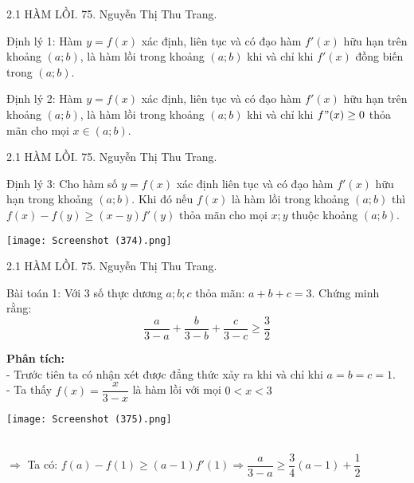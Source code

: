 \begin{frame}{2.1 HÀM LỒI. \hspace{6cm}  75. Nguyễn Thị Thu Trang.}
\begin{block}{Định lý 1:}
Hàm $y=f(x)$ xác định, liên tục và có đạo hàm $f'(x)$ hữu hạn trên khoảng $(a; b)$, là hàm lồi trong khoảng $(a; b)$ khi và chỉ khi $f'(x)$ đồng biến trong $(a; b).$
\end{block}
\pause
\begin{block}{Định lý 2:}
Hàm $y=f(x)$ xác định, liên tục và có đạo hàm $f'(x)$ hữu hạn trên khoảng $(a; b)$, là hàm lồi trong khoảng $(a; b)$ khi và chỉ khi $f"(x) \ge 0$ thỏa mãn cho mọi $ x \in (a; b).$
\end{block}
\end{frame}
\begin{frame}{2.1 HÀM LỒI. \hspace{6cm}  75. Nguyễn Thị Thu Trang.}
\begin{minipage}{0.5\linewidth}
\begin{block}{Định lý 3: }
    Cho hàm số $y=f(x)$ xác định liên tục và có đạo hàm $f'(x)$ hữu hạn trong khoảng $(a; b)$. Khi đó nếu $f(x)$ là hàm lồi trong khoảng $(a; b)$ thì $f(x)-f(y) \ge (x-y)f'(y)$ thỏa mãn cho mọi $x; y$ thuộc khoảng $(a; b)$.
\end{block}
\end{minipage}\qquad
 \begin{minipage}{0.4\linewidth}
			\texttt{[image: Screenshot (374).png]}
\end{minipage}
\end{frame}
\begin{frame}{2.1 HÀM LỒI. \hspace{6cm}  75. Nguyễn Thị Thu Trang.}
\begin{block}{Bài toán 1:}
Với $3$ số thực dương $a; b; c$ thỏa mãn: $a+b+c=3$. Chứng minh rằng:\\
$$\frac{a}{3-a}+\frac{b}{3-b}+\frac{c}{3-c}\ge \frac{3}{2}$$
\end{block}
\pause
\textbf{Phân tích:} \\
- Trước tiên ta có nhận xét được đẳng thức xảy ra khi và chỉ khi $a=b=c=1$.\\
\pause
- Ta thấy $f(x)= \dfrac{x}{3-x}$ là hàm lồi với mọi $0 < x < 3$
 \begin{minipage}{0.4\linewidth}
			\texttt{[image: Screenshot (375).png]}
\end{minipage}\\
\pause
$\Rightarrow $ Ta có: $f(a)-f(1)\ge (a-1)f'(1) \Rightarrow \dfrac{a}{3-a}\ge \dfrac{3}{4}(a-1)+\dfrac{1}{2}$
\end{frame}
